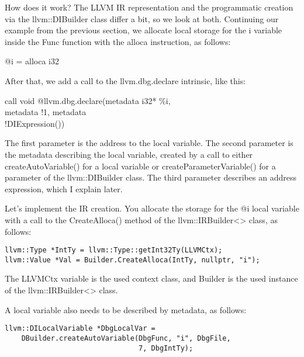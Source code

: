 How does it work? The LLVM IR representation and the programmatic creation via the llvm::DIBuilder class differ a bit, so we look at both. Continuing our example from the previous section, we allocate local storage for the i variable inside the Func function with the alloca instruction, as follows:\par

\begin{tcolorbox}[colback=white,colframe=black]
@i = alloca i32
\end{tcolorbox}

After that, we add a call to the llvm.dbg.declare intrinsic, like this:\par

\begin{tcolorbox}[colback=white,colframe=black]
call void @llvm.dbg.declare(metadata i32* \%i, \\
\hspace*{3cm}metadata !1, metadata \\
\hspace*{3cm}!DIExpression())
\end{tcolorbox}

The first parameter is the address to the local variable. The second parameter is the metadata describing the local variable, created by a call to either createAutoVariable() for a local variable or createParameterVariable() for a parameter of the llvm::DIBuilder class. The third parameter describes an address expression, which I explain later.\par

Let's implement the IR creation. You allocate the storage for the @i local variable with a call to the CreateAlloca() method of the llvm::IRBuilder<> class, as follows:\par

\begin{lstlisting}[caption={}]
llvm::Type *IntTy = llvm::Type::getInt32Ty(LLVMCtx);
llvm::Value *Val = Builder.CreateAlloca(IntTy, nullptr, "i");
\end{lstlisting}

The LLVMCtx variable is the used context class, and Builder is the used instance of the llvm::IRBuilder<> class.\par

A local variable also needs to be described by metadata, as follows:\par

\begin{lstlisting}[caption={}]
llvm::DILocalVariable *DbgLocalVar =
	DBuilder.createAutoVariable(DbgFunc, "i", DbgFile,
								7, DbgIntTy);
\end{lstlisting}

